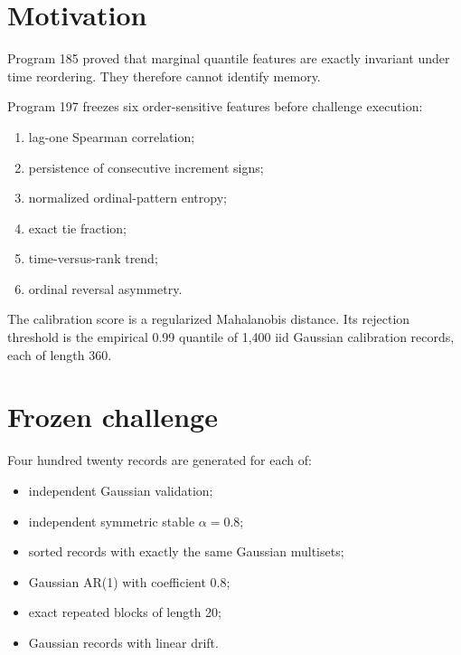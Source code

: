 \documentclass[11pt,a4paper,openany]{report}
\begin{document}
\section{Motivation}

Program 185 proved that marginal quantile features are exactly invariant under time reordering. They therefore cannot identify memory.

Program 197 freezes six order-sensitive features before challenge execution:

\begin{enumerate}
\item 
lag-one Spearman correlation;

\item 
persistence of consecutive increment signs;

\item 
normalized ordinal-pattern entropy;

\item 
exact tie fraction;

\item 
time-versus-rank trend;

\item 
ordinal reversal asymmetry.

\end{enumerate}

The calibration score is a regularized Mahalanobis distance. Its rejection threshold is the empirical 0.99 quantile of 1,400 iid Gaussian calibration records, each of length 360.

\section{Frozen challenge}

Four hundred twenty records are generated for each of:

\begin{itemize}
\item 
independent Gaussian validation;

\item 
independent symmetric stable \(\alpha=0.8\);

\item 
sorted records with exactly the same Gaussian multisets;

\item 
Gaussian AR(1) with coefficient \(0.8\);

\item 
exact repeated blocks of length 20;

\item 
Gaussian records with linear drift.

\end{itemize}
\end{document}
